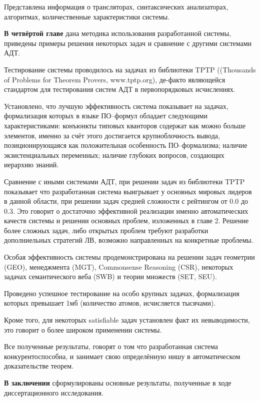 \documentclass[a4paper]{report}
\begin{document}
Представлена информация о трансляторах, синтаксических анализаторах, алгоритмах, количественные характеристики системы.


\textbf{В четвёртой главе} дана методика использования разработанной системы, приведены примеры решения некоторых задач и сравнение с другими системами АДТ.

Тестирование системы проводилось на задачах из библиотеки TPTP ((Thousands of Problems for Theorem Provers, www.tptp.org), де-факто являющейся стандартом для тестирования систем АДТ в первопорядковых исчислениях.

Установлено, что лучшую эффективность система показывает на задачах, формализация которых в языке ПО--формул обладает следующими характеристиками: конъюнкты типовых кванторов содержат как можно больше элементов, именно за счёт этого достигается крупноблочность вывода, позиционирующаяся как положительная особенность ПО--формализма; наличие экзистенциальных переменных; наличие глубоких вопросов, создающих иерархию знаний.

Сравнение с иными системами АДТ, при решении задач из библиотеки TPTP показывает что разработанная система выигрывает у основных мировых лидеров в данной области, при решении задач средней сложности с рейтингом от 0.0 до 0.3. Это говорит о достаточно эффективной реализации именно автоматических качеств системы и решении основных проблем, изложенных в главе 2. Решение более сложных задач, либо открытых проблем требуют разработки дополниельных стратегий ЛВ, возможно направленных на конкретные проблемы.

Особая эффективность системы продемонстрирована на решении задач геометрии (GEO), менеджмента (MGT), Commonsense Reasoning (CSR),  некоторых задачах семантического веба (SWB) и теории множеств (SET, SEU).

Проведено успешное тестирование на особо крупных задачах, формализация которых превышает 1мб (количество атомов, исчисляется тысячами).

Кроме того, для некоторых satisfiable задач установлен факт их невыводимости, это говорит о более широком применении системы.

Все полученные результаты, говорят о том что разработанная система конкурентоспособна, и занимает свою определённую нишу в автоматическом доказательстве теорем.

\textbf{В заключении} сформулированы основные результаты, полученные в ходе диссертационного исследования.
\end{document}
